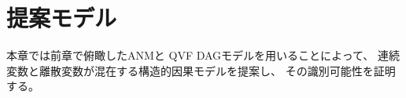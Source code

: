 
\section{提案モデル}
\label{part:proposal}

本章では前章で俯瞰したANM\cite{Park2020-ey}と
QVF DAGモデル\cite{Park2017-hw}を用いることによって、
連続変数と離散変数が混在する構造的因果モデルを提案し、
その識別可能性を証明する。
%

%


